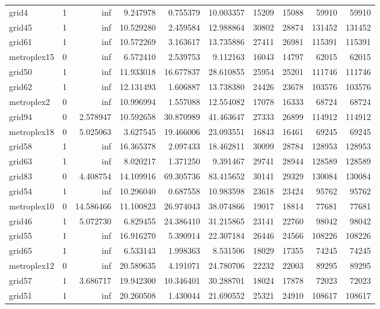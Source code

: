 \begin{longtable}{|l|r|r|r|r|r|r|r|r|r|}
grid4 & 1 & inf & 9.247978 & 0.755379 & 10.003357 & 15209 & 15088 & 59910 & 59910 \\
grid45 & 1 & inf & 10.529280 & 2.459584 & 12.988864 & 30802 & 28874 & 131452 & 131452 \\
grid61 & 1 & inf & 10.572269 & 3.163617 & 13.735886 & 27411 & 26981 & 115391 & 115391 \\
metroplex15 & 0 & inf & 6.572410 & 2.539753 & 9.112163 & 16043 & 14797 & 62015 & 62015 \\
grid50 & 1 & inf & 11.933018 & 16.677837 & 28.610855 & 25954 & 25201 & 111746 & 111746 \\
grid62 & 1 & inf & 12.131493 & 1.606887 & 13.738380 & 24426 & 23678 & 103576 & 103576 \\
metroplex2 & 0 & inf & 10.996994 & 1.557088 & 12.554082 & 17078 & 16333 & 68724 & 68724 \\
grid94 & 0 & 2.578947 & 10.592658 & 30.870989 & 41.463647 & 27333 & 26899 & 114912 & 114912 \\
metroplex18 & 0 & 5.025063 & 3.627545 & 19.466006 & 23.093551 & 16843 & 16461 & 69245 & 69245 \\
grid58 & 1 & inf & 16.365378 & 2.097433 & 18.462811 & 30099 & 28784 & 128953 & 128953 \\
grid63 & 1 & inf & 8.020217 & 1.371250 & 9.391467 & 29741 & 28944 & 128589 & 128589 \\
grid83 & 0 & 4.408754 & 14.109916 & 69.305736 & 83.415652 & 30141 & 29329 & 130084 & 130084 \\
grid54 & 1 & inf & 10.296040 & 0.687558 & 10.983598 & 23618 & 23424 & 95762 & 95762 \\
metroplex10 & 0 & 14.586466 & 11.100823 & 26.974043 & 38.074866 & 19017 & 18814 & 77681 & 77681 \\
grid46 & 1 & 5.072730 & 6.829455 & 24.386410 & 31.215865 & 23141 & 22760 & 98042 & 98042 \\
grid55 & 1 & inf & 16.916270 & 5.390914 & 22.307184 & 26446 & 24566 & 108226 & 108226 \\
grid65 & 1 & inf & 6.533143 & 1.998363 & 8.531506 & 18029 & 17355 & 74245 & 74245 \\
metroplex12 & 0 & inf & 20.589635 & 4.191071 & 24.780706 & 22232 & 22003 & 89295 & 89295 \\
grid57 & 1 & 3.686717 & 19.942300 & 10.346401 & 30.288701 & 18024 & 17878 & 72023 & 72023 \\
grid51 & 1 & inf & 20.260508 & 1.430044 & 21.690552 & 25321 & 24910 & 108617 & 108617 \\

\end{longtable}
